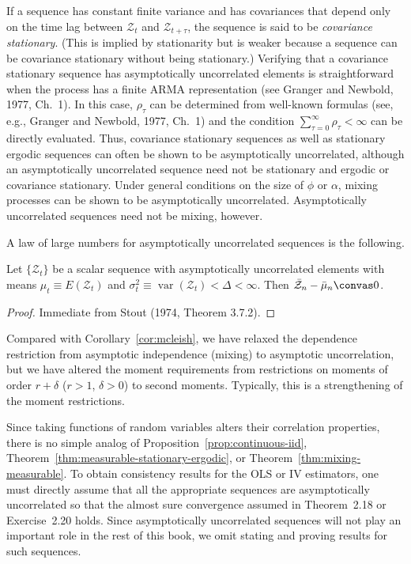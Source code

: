 If a sequence has constant finite variance and has covariances that depend only on the time lag between $\mathcal{Z}_t$ and $\mathcal{Z}_{t+\tau}$, the sequence is said to be \emph{covariance stationary}. (This is implied by stationarity but is weaker because a sequence can be covariance stationary without being stationary.) Verifying that a covariance stationary sequence has asymptotically uncorrelated elements is straightforward when the process has a finite ARMA representation (see Granger and Newbold, 1977, Ch.~1). In this case, $\rho_\tau$ can be determined from well-known formulas (see, e.g., Granger and Newbold, 1977, Ch.~1) and the condition $\sum_{\tau=0}^{\infty} \rho_\tau < \infty$ can be directly evaluated. Thus, covariance stationary sequences as well as stationary ergodic sequences can often be shown to be asymptotically uncorrelated, although an asymptotically uncorrelated sequence need not be stationary and ergodic or covariance stationary. Under general conditions on the size of $\phi$ or $\alpha$, mixing processes can be shown to be asymptotically uncorrelated. Asymptotically uncorrelated sequences need not be mixing, however.

A law of large numbers for asymptotically uncorrelated sequences is the following.

\begin{theorem}\label{thm:asymp-uncorrelated-lln}
Let $\{\mathcal{Z}_t\}$ be a scalar sequence with asymptotically uncorrelated elements with means $\mu_t \equiv E(\mathcal{Z}_t)$ and $\sigma_t^2 \equiv \operatorname{var}(\mathcal{Z}_t) < \Delta < \infty$. Then $\bar{\mathcal{Z}}_n - \bar{\mu}_n \convas 0$.
\end{theorem}

\begin{proof}
Immediate from Stout (1974, Theorem 3.7.2). \qedhere
\end{proof}

Compared with Corollary~\ref{cor:mcleish}, we have relaxed the dependence restriction from asymptotic independence (mixing) to asymptotic uncorrelation, but we have altered the moment requirements from restrictions on moments of order $r + \delta$ ($r > 1$, $\delta > 0$) to second moments. Typically, this is a strengthening of the moment restrictions.

Since taking functions of random variables alters their correlation properties, there is no simple analog of Proposition~\ref{prop:continuous-iid}, Theorem~\ref{thm:measurable-stationary-ergodic}, or Theorem~\ref{thm:mixing-measurable}. To obtain consistency results for the OLS or IV estimators, one must directly assume that all the appropriate sequences are asymptotically uncorrelated so that the almost sure convergence assumed in Theorem~2.18 or Exercise~2.20 holds. Since asymptotically uncorrelated sequences will not play an important role in the rest of this book, we omit stating and proving results for such sequences.

